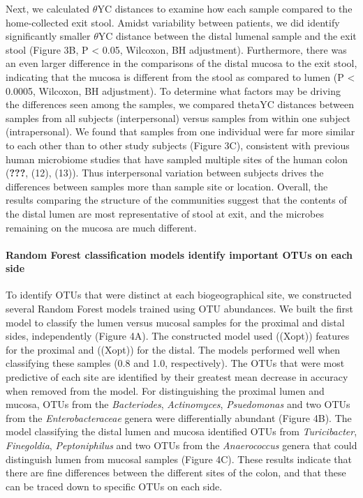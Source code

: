 \documentclass[11pt,]{article}
\let\oldparagraph\paragraph
\renewcommand{\paragraph}[1]{\oldparagraph{#1}\mbox{}}
\begin{document}
Next, we calculated \({\theta}\)YC distances to examine how each sample
compared to the home-collected exit stool. Amidst variability between
patients, we did identify significantly smaller \({\theta}\)YC distance
between the distal lumenal sample and the exit stool (Figure 3B, P
\textless{} 0.05, Wilcoxon, BH adjustment). Furthermore, there was an
even larger difference in the comparisons of the distal mucosa to the
exit stool, indicating that the mucosa is different from the stool as
compared to lumen (P \textless{} 0.0005, Wilcoxon, BH adjustment). To
determine what factors may be driving the differences seen among the
samples, we compared thetaYC distances between samples from all subjects
(interpersonal) versus samples from within one subject (intrapersonal).
We found that samples from one individual were far more similar to each
other than to other study subjects (Figure 3C), consistent with previous
human microbiome studies that have sampled multiple sites of the human
colon (\textbf{???}, (12), (13)). Thus interpersonal variation between
subjects drives the differences between samples more than sample site or
location. Overall, the results comparing the structure of the
communities suggest that the contents of the distal lumen are most
representative of stool at exit, and the microbes remaining on the
mucosa are much different.

\paragraph{Random Forest classification models identify important OTUs
on each
side}\label{random-forest-classification-models-identify-important-otus-on-each-side}

To identify OTUs that were distinct at each biogeographical site, we
constructed several Random Forest models trained using OTU abundances.
We built the first model to classify the lumen versus mucosal samples
for the proximal and distal sides, independently (Figure 4A). The
constructed model used ((Xopt)) features for the proximal and ((Xopt))
for the distal. The models performed well when classifying these samples
(0.8 and 1.0, respectively). The OTUs that were most predictive of each
site are identified by their greatest mean decrease in accuracy when
removed from the model. For distinguishing the proximal lumen and
mucosa, OTUs from the \emph{Bacteriodes}, \emph{Actinomyces},
\emph{Psuedomonas} and two OTUs from the \emph{Enterobacteraceae} genera
were differentially abundant (Figure 4B). The model classifying the
distal lumen and mucosa identified OTUs from \emph{Turicibacter},
\emph{Finegoldia}, \emph{Peptoniphilus} and two OTUs from the
\emph{Anaerococcus} genera that could distinguish lumen from mucosal
samples (Figure 4C). These results indicate that there are fine
differences between the different sites of the colon, and that these can
be traced down to specific OTUs on each side.
\end{document}
